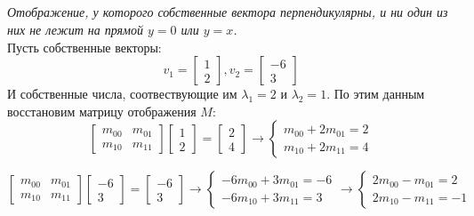 \documentclass[a5paper, 10pt]{article}
\theoremstyle{definition}
\theoremstyle{plain}
\theoremstyle{remark}
\begin{document}
\subsection{}
\textit{Отображение, у которого собственные вектора перпендикулярны, и ни один из них не лежит на прямой $y=0$ или $y=x$.}\\
Пусть собственные векторы:
\begin{equation}
v_1 = 
\begin{bmatrix}
1\\
2
\end{bmatrix}
,
v_2 = 
\begin{bmatrix}
-6\\
3
\end{bmatrix}
\end{equation}
И собственные числа, соотвествующие им $\lambda_1 = 2$ и $\lambda_2 = 1$. По этим данным восстановим матрицу отображения $M$:
\begin{equation}
\begin{bmatrix}
m_{0 0} & m_{0 1}\\
m_{1 0} & m_{1 1}
\end{bmatrix}
\begin{bmatrix}
1\\
2
\end{bmatrix}
=
\begin{bmatrix}
2\\
4
\end{bmatrix}
\to
\begin{cases}
m_{0 0} + 2m_{0 1} = 2\\
m_{1 0} + 2m_{1 1} = 4
\end{cases}
\end{equation}

\begin{equation}
\begin{bmatrix}
m_{0 0} & m_{0 1}\\
m_{1 0} & m_{1 1}
\end{bmatrix}
\begin{bmatrix}
-6\\
3
\end{bmatrix}
=
\begin{bmatrix}
-6\\
3
\end{bmatrix}
\to
\begin{cases}
-6 m_{0 0} + 3m_{0 1} = -6\\
-6m_{1 0} + 3m_{1 1} = 3
\end{cases}
\to
\begin{cases}
2 m_{0 0} - m_{0 1} = 2\\
2m_{1 0} - m_{1 1} = -1
\end{cases}
\end{equation}
\end{document}
